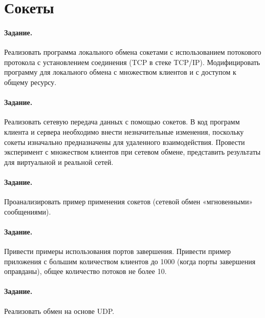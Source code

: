 




%

\section{Сокеты}

\paragraph{Задание.} Реализовать программа локального обмена сокетами с использованием потокового протокола с установлением соединения (TCP в стеке TCP/IP). Модифицировать программу для локального обмена с множеством клиентов и с доступом к общему ресурсу.

\paragraph{Задание.}  Реализовать сетевую передача данных с помощью сокетов. В код программ клиента и сервера необходимо внести незначительные изменения, поскольку сокеты изначально предназначены для удаленного взаимодействия. Провести эксперимент с множеством клиентов при сетевом обмене, представить результаты для виртуальной и реальной сетей.

\paragraph{Задание.} Проанализировать пример применения сокетов (сетевой обмен «мгновенными» сообщениями).

\paragraph{Задание.} Привести примеры использования портов завершения. Привести пример приложения с большим количеством клиентов до 1000 (когда порты завершения оправданы), общее количество потоков не более 10.

\paragraph{Задание.} Реализовать обмен на основе UDP.

